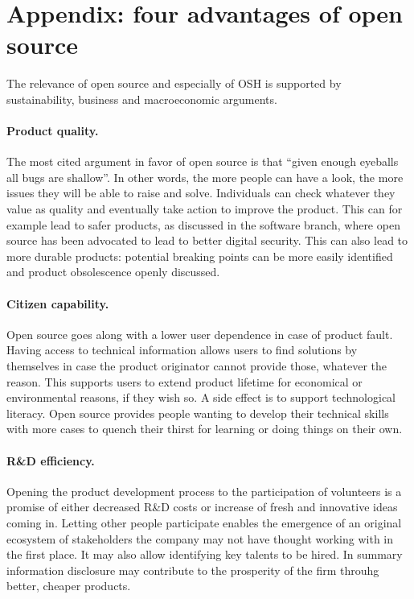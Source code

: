 \documentclass{article}
\begin{document}
{\color{gray}\section*{Appendix: four advantages of open source}
\label{sec:advantages}
The relevance of open source and especially of OSH is supported by sustainability, business and macroeconomic arguments.

\paragraph{Product quality.} The most cited argument in favor of open source is that ``given enough eyeballs all bugs are shallow''. In other words, the more people can have a look, the more issues they will be able to raise and solve. Individuals can check whatever they value as quality and eventually take action to improve the product. This can for example lead to safer products, as discussed in the software branch, where open source has been advocated to lead to better digital security. This can also lead to more durable products: potential breaking points can be more easily identified and product obsolescence openly discussed.

\paragraph{Citizen capability.} Open source goes along with a lower user dependence in case of product fault. Having access to technical information allows users to find solutions by themselves in case the product originator cannot provide those, whatever the reason. This supports users to extend product lifetime for economical or environmental reasons, if they wish so. A side effect is to support technological literacy. Open source provides people wanting to develop their technical skills with more cases to quench their thirst for learning or doing things on their own.

\paragraph{R\&D efficiency.} Opening the product development process to the participation of volunteers is a promise of either decreased R\&D costs or increase of fresh and innovative ideas coming in. Letting other people participate enables the emergence of an original ecosystem of stakeholders the company may not have thought working with in the first place. It may also allow identifying key talents to be hired. In summary information disclosure may contribute to the prosperity of the firm throuhg better, cheaper products. 

}
\end{document}
